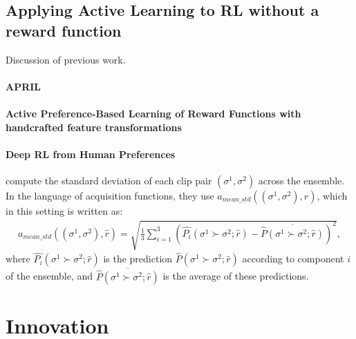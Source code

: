 \documentclass[11pt, a4paper, bibliography=totoc]{report}
\newcommand{\rp}{\hat{r}}
\begin{document}
\chapter{Applying Active Learning to RL without a reward function}
Discussion of previous work.

\subsection{APRIL}

\subsection{Active Preference-Based Learning of Reward Functions with handcrafted feature transformations}

\subsection{Deep RL from Human Preferences}
\cite{Christiano2017} compute the standard deviation of each clip pair $(\sigma^1, \sigma^2)$ across the ensemble. In the language of acquisition functions, they use $ a_{mean\_std}((\sigma^1, \sigma^2), \rp) $, which in this setting is written as:
\begin{align*}
a_{mean\_std}((\sigma^1, \sigma^2), \rp) = \sqrt{\frac{1}{3}\sum_{i=1}^{3}\left(\hat{P_i}(\sigma^1 \succ \sigma^2  ; \rp) - \overline{\hat{P}(\sigma^1 \succ \sigma^2  ; \rp)}\right)^2},
\end{align*}
where $ \hat{P_i}(\sigma^1 \succ \sigma^2  ; \rp) $ is the prediction $ \hat{P}(\sigma^1 \succ \sigma^2  ; \rp) $ according to component $ i $ of the ensemble, and $ \overline{\hat{P}(\sigma^1 \succ \sigma^2  ; \rp)} $ is the average of these predictions.

\part{Innovation}
\end{document}
